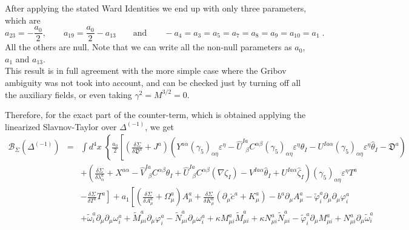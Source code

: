 \begin{appendix}
\noindent After applying the stated Ward Identities we end up with only three parameters, which are
\begin{equation}
a_{23}=-\frac{a_0}{2}, \qquad a_{19}=\frac{a_0}{2} - a_{13} \qquad \text{and} \qquad -a_{4}=a_{3}=a_{5}=a_{7}=a_{8}=a_{9}=a_{10}=a_{1}\;.
\end{equation}
All the others are null. Note that we can write all the non-null parameters as $a_{0}$, $a_{1}$ and $a_{13}$.\\
This result is in full agreement with the more simple case where the Gribov ambiguity was not took into account, and can be checked just by turning off all the auxiliary fields, or even taking $\gamma^{2}=M^{3/2}=0$.

\noindent Therefore, for the exact part of the counter-term, which is obtained applying the linearized Slavnov-Taylor over $\Delta^{(-1)}$, we get
\begin{eqnarray}
\label{extct}
\mathcal{B}_{\Sigma}(\Delta^{(-1)}) &=& \int d^{4}x\;\left\{
  \frac{a_{0}}{2}\left[
  \left(\frac{\delta\Sigma}{\delta\mathfrak{D}^{a}}+J^{a}\right)
  \left( Y^{a\alpha}(\gamma_{5})_{\alpha\eta}\varepsilon^{\eta}
- \hat{U}^{Ia}_{\;\;\beta}C^{\alpha\beta}(\gamma_{5})_{\alpha\eta}\varepsilon^{\eta}\theta_{I}
- U^{Ia\alpha}(\gamma_{5})_{\alpha\eta}\varepsilon^{\eta}\hat{\theta}_{I}
- \mathfrak{D}^{a}
  \right)
  \right.
  \right.
\nonumber \\
&&
+ \left(\frac{\delta\Sigma}{\delta\lambda^{a}_{\alpha}}+X^{a\alpha}
- \hat{V}^{Ia}_{\;\;\beta}C^{\alpha\beta}\theta_{I}
+ \hat{U}^{Ia}_{\;\;\beta}C^{\alpha\beta}(\nabla\zeta_{I})
- V^{Ia\alpha}\hat{\theta}_{I}
+ U^{Ia\alpha}\hat{\zeta}_{I} \right)
  (\gamma_{5})_{\alpha\eta}\varepsilon^{\eta}T^{a}
\nonumber \\
&&
\left.
- \frac{\delta\Sigma}{\delta T^{a}}T^{a}
\right]
+ a_{1}\left[ \left(\frac{\delta\Sigma}{\delta A^{a}_{\mu}}+\Omega^{a}_{\mu}\right)A^{a}_{\mu}
+ \frac{\delta\Sigma}{\delta K^{a}_{\mu}}(\partial_{\mu}\check{c}^{a}+K^{a}_{\mu})
- b^{a}\partial_{\mu}A^{a}_{\mu}
- \tilde{\varphi}^{a}_{i}\partial_{\mu}\partial_{\mu}\varphi^{a}_{i}
  \right.
\nonumber \\
&&
+ \tilde{\omega}^{a}_{i}\partial_{\mu}\partial_{\mu}\omega^{a}_{i}
+ \tilde{M}^{a}_{\mu i}\partial_{\mu}\varphi^{a}_{i}
- \tilde{N}^{a}_{\mu i}\partial_{\mu}\omega^{a}_{i}
+ \kappa M^{a}_{\mu i}\tilde{M}^{a}_{\mu i}
+ \kappa N^{a}_{\mu i}\tilde{N}^{a}_{\mu i}
-\tilde{\varphi}^{a}_{i}\partial_{\mu}M^{a}_{\mu i}
+ N^{a}_{\mu i}\partial_{\mu}\tilde{\omega}^{a}_{i}
\nonumber \\

\end{eqnarray}
\end{appendix}
